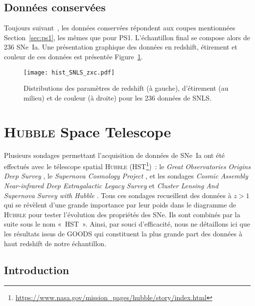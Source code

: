 \documentclass[../main/main.tex]{subfiles}
\begin{document}
\subsection{Données conservées}\label{sec:snlsdata}

Toujours suivant~\cite{scolnic2018}, les données conservées répondent aux coupes
mentionnées Section~\ref{sec:ps1}, les mêmes que pour PS1. L'échantillon final
se compose alors de 236 SNe~Ia. Une présentation graphique des données en
redshift, étirement et couleur de ces données est présentée
Figure~\ref{fig:snlshist}.

\begin{figure}[ht]
    \centering
    \texttt{[image: hist\_SNLS\_zxc.pdf]}
    \caption[Distributions des paramètres de redshift, étirement et couleur de
    SNLS]{Distributions des paramètres de redshift (à gauche), d'étirement (au
    milieu) et de couleur (à droite) pour les 236 données de SNLS.}
    \label{fig:snlshist}
\end{figure}

\section{\textsc{Hubble} Space Telescope}\label{sec:hst}

Plusieurs sondages permettant l'acquisition de données de SNe~Ia ont été
effectués avec le télescope spatial \textsc{Hubble}
(HST\footnote{\href{https://www.nasa.gov/mission_pages/hubble/story/index.html}
{https://www.nasa.gov/mission\_pages/hubble/story/index.html}})~: le
\textit{Great Observatories Origins Deep
Survey} \citep[GOODS,][]{giavalisco2004, strolger2004, riess2007}, le
\textit{Supernova Cosmology Project} \citep[SCP,][]{suzuki2012}, et les sondages
\textit{Cosmic Assembly Near-infrared Deep Extragalactic Legacy
Survey} \citep[CANDELS,][]{rodney2014} et \textit{Cluster Lensing And Supernova
Survey with Hubble} \citep[CLASH,][]{graur2014}. Tous ces sondages recueillent
des données à $z > 1$ qui se révèlent d'une grande importance par leur poids
dans le diagramme de \textsc{Hubble} pour tester l'évolution des propriétés des
SNe. Ils sont combinés par la suite sous le nom «~HST~». Ainsi, par souci
d'efficacité, nous ne détaillons ici que les résultats issus de GOODS qui
constituent la plus grande part des données à haut redshift de notre
échantillon.

\subsection{Introduction}\label{ssec:hstintro}
\end{document}
